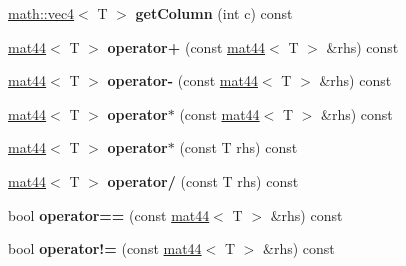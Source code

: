 \begin{DoxyCompactItemize}
\item 
\hypertarget{classmath_1_1mat44_a041050c88d4c8dd34510dd315cfb3e3d}{
\hyperlink{classmath_1_1vec4}{math::vec4}$<$ T $>$ {\bfseries getColumn} (int c) const }
\label{classmath_1_1mat44_a041050c88d4c8dd34510dd315cfb3e3d}

\item 
\hypertarget{classmath_1_1mat44_afd9925dcf5d7ef9ec929b9d801bf4664}{
\hyperlink{classmath_1_1mat44}{mat44}$<$ T $>$ {\bfseries operator+} (const \hyperlink{classmath_1_1mat44}{mat44}$<$ T $>$ \&rhs) const }
\label{classmath_1_1mat44_afd9925dcf5d7ef9ec929b9d801bf4664}

\item 
\hypertarget{classmath_1_1mat44_a6654255b231c92172d58b9c46dfbf6c4}{
\hyperlink{classmath_1_1mat44}{mat44}$<$ T $>$ {\bfseries operator-\/} (const \hyperlink{classmath_1_1mat44}{mat44}$<$ T $>$ \&rhs) const }
\label{classmath_1_1mat44_a6654255b231c92172d58b9c46dfbf6c4}

\item 
\hypertarget{classmath_1_1mat44_a8fc9f46654403e9d218dbddd4dc2227b}{
\hyperlink{classmath_1_1mat44}{mat44}$<$ T $>$ {\bfseries operator$\ast$} (const \hyperlink{classmath_1_1mat44}{mat44}$<$ T $>$ \&rhs) const }
\label{classmath_1_1mat44_a8fc9f46654403e9d218dbddd4dc2227b}

\item 
\hypertarget{classmath_1_1mat44_aa7a3e1de27d2a91e838b8bc5b08978f5}{
\hyperlink{classmath_1_1mat44}{mat44}$<$ T $>$ {\bfseries operator$\ast$} (const T rhs) const }
\label{classmath_1_1mat44_aa7a3e1de27d2a91e838b8bc5b08978f5}

\item 
\hypertarget{classmath_1_1mat44_a62c4961f112c59ff12801ff101bc8f85}{
\hyperlink{classmath_1_1mat44}{mat44}$<$ T $>$ {\bfseries operator/} (const T rhs) const }
\label{classmath_1_1mat44_a62c4961f112c59ff12801ff101bc8f85}

\item 
\hypertarget{classmath_1_1mat44_a2a0608c179aece3a7d191abc34df98a5}{
bool {\bfseries operator==} (const \hyperlink{classmath_1_1mat44}{mat44}$<$ T $>$ \&rhs) const }
\label{classmath_1_1mat44_a2a0608c179aece3a7d191abc34df98a5}

\item 
\hypertarget{classmath_1_1mat44_a10026cea05fdc44a7f7df95ac89f6b50}{
bool {\bfseries operator!=} (const \hyperlink{classmath_1_1mat44}{mat44}$<$ T $>$ \&rhs) const }
\label{classmath_1_1mat44_a10026cea05fdc44a7f7df95ac89f6b50}


\end{DoxyCompactItemize}
